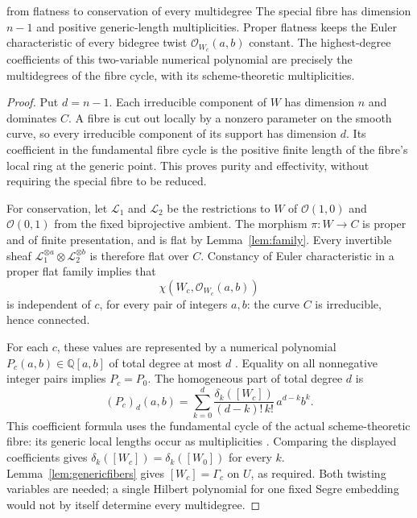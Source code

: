 \documentclass[acmsmall,screen,nonacm]{acmart}
\theoremstyle{definition}
\theoremstyle{remark}
\newcommand{\OO}{\mathcal{O}}
\newcommand{\pdeg}{\delta}
\begin{document}
\begin{roadmapbox}{from flatness to conservation of every multidegree}
The special fibre has dimension $n-1$ and positive generic-length
multiplicities.  Proper flatness keeps the Euler characteristic of every
bidegree twist $\OO_{W_c}(a,b)$ constant.  The highest-degree coefficients
of this two-variable numerical polynomial are precisely the multidegrees
of the fibre cycle, with its scheme-theoretic multiplicities.
\end{roadmapbox}

\begin{proof}
Put $d=n-1$.  Each irreducible component of $W$ has dimension $n$ and
dominates $C$.  A fibre is cut out locally by a nonzero parameter on the
smooth curve, so every irreducible component of its support has dimension
$d$.  Its coefficient in the fundamental fibre cycle is the positive
finite length of the fibre's local ring at the generic point.  This proves
purity and effectivity, without requiring the special fibre to be reduced.

For conservation, let $\mathcal L_1$ and $\mathcal L_2$ be the restrictions
to $W$ of $\OO(1,0)$ and $\OO(0,1)$ from the fixed biprojective ambient.
The morphism $\pi:W\to C$ is proper and of finite presentation, and is flat
by Lemma~\ref{lem:family}.  Every invertible sheaf
$\mathcal L_1^{\otimes a}\otimes\mathcal L_2^{\otimes b}$ is therefore flat
over $C$.  Constancy of Euler characteristic in a proper flat family
\cite[Tag 0B9T]{StacksProject} implies that
\[
  \chi\!\left(W_c,\OO_{W_c}(a,b)\right)
\]
is independent of $c$, for every pair of integers $a,b$: the curve $C$ is
irreducible, hence connected.

For each $c$, these values are represented by a numerical polynomial
$P_c(a,b)\in\mathbb Q[a,b]$ of total degree at most $d$
\cite[Tag 0BEM]{StacksProject}.  Equality on all nonnegative integer pairs
implies $P_c=P_0$.  The homogeneous part of total degree $d$ is
\[
  (P_c)_d(a,b)=
  \sum_{k=0}^{d}
  \frac{\pdeg_k([W_c])}{(d-k)!\,k!}\,a^{d-k}b^k.
\]
This coefficient formula uses the fundamental cycle of the actual
scheme-theoretic fibre: its generic local lengths occur as multiplicities
\cite[Tags 0BEN, 0BEP, 0BES]{StacksProject}.  Comparing the displayed
coefficients gives $\pdeg_k([W_c])=\pdeg_k([W_0])$ for every $k$.
Lemma~\ref{lem:genericfibers} gives $[W_c]=\Gamma_c$ on $U$, as required.
Both twisting variables are needed; a single Hilbert polynomial for one
fixed Segre embedding would not by itself determine every multidegree.
\end{proof}
\end{document}
